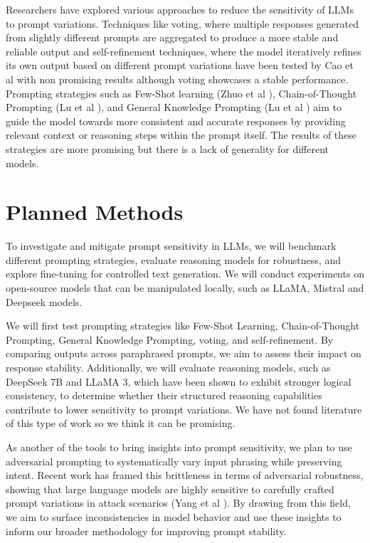 \documentclass[fleqn,moreauthors,10pt]{ds_report}
\begin{document}
Researchers have explored various approaches to reduce the sensitivity of LLMs to prompt variations. Techniques like voting, where multiple responses generated from slightly different prompts are aggregated to produce a more stable and reliable output and self-refinement techniques, where the model iteratively refines its own output based on different prompt variations have been tested by Cao et al \cite{cao2024worstpromptperformancelarge} with non promising results although voting showcases a stable performance. 
Prompting strategies such as Few-Shot learning (Zhuo et al \cite{zhuo2024prosa}), Chain-of-Thought Prompting (Lu et al \cite{lu2024promptsdifferenttermssensitivity}), and General Knowledge Prompting (Lu et al \cite{lu2024promptsdifferenttermssensitivity}) aim to guide the model towards more consistent and accurate responses by providing relevant context or reasoning steps within the prompt itself. The results of these strategies are more promising but there is a lack of generality for different models.  
	



\section*{Planned Methods}

To investigate and mitigate prompt sensitivity in LLMs, we will benchmark different prompting strategies, evaluate reasoning models for robustness, and explore fine-tuning for controlled text generation. We will conduct experiments on open-source models that can be manipulated locally, such as LLaMA, Mistral and Deepseek models.

We will first test prompting strategies like Few-Shot Learning, Chain-of-Thought Prompting, General Knowledge Prompting, voting, and self-refinement. By comparing outputs across paraphrased prompts, we aim to assess their impact on response stability. Additionally, we will evaluate reasoning models, such as DeepSeek 7B and LLaMA 3, which have been shown to exhibit stronger logical consistency, to determine whether their structured reasoning capabilities contribute to lower sensitivity to prompt variations. We have not found literature of this type of work so we think it can be promising.

As another of the tools to bring insights into prompt sensitivity, we plan to use adversarial prompting to systematically vary input phrasing while preserving intent.  Recent work has framed this brittleness in terms of adversarial robustness, showing that large language models are highly sensitive to carefully crafted prompt variations in attack scenarios (Yang et al \cite{yang2024assessingadversarialrobustnesslarge}). By drawing from this field, we aim to surface inconsistencies in model behavior and use these insights to inform our broader methodology for improving prompt stability.
\end{document}
